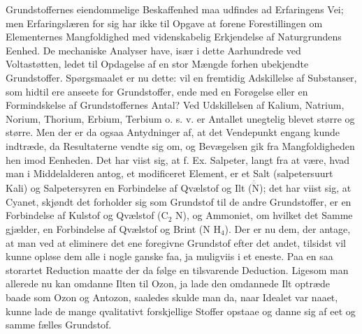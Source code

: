 \documentclass[12pt,a4paper]{book}
\begin{document}
Grundstoffernes eiendommelige Beskaffenhed maa udfindes ad Erfaringens
Vei; men Erfaringslæren for sig har ikke til Opgave at forene
Forestillingen om Elementernes Mangfoldighed med videnskabelig Erkjendelse
af Naturgrundens Eenhed. De mechaniske Analyser have, især i dette
Aarhundrede ved Voltastøtten, ledet til Opdagelse af en stor Mængde
forhen ubekjendte Grundstoffer. Spørgsmaalet er nu dette: vil en fremtidig
Adskillelse af Substanser, som hidtil ere anseete for Grundstoffer, ende
med en Forøgelse eller en Formindskelse af Grundstoffernes Antal? Ved
Udskillelsen af Kalium, Natrium, Norium, Thorium, Erbium, Terbium o. s. v.
er Antallet unegtelig blevet større og større. Men der er da ogsaa
Antydninger af, at det Vendepunkt engang kunde indtræde, da Resultaterne
vendte sig om, og Bevægelsen gik fra Mangfoldigheden hen imod Eenheden.
Det har viist sig, at f. Ex. Salpeter, langt fra at være, hvad man i
Middelalderen antog, et modificeret Element, er et Salt (salpetersuurt
Kali) og Salpetersyren en Forbindelse af Qvælstof og Ilt
($\ddot{\dddot{\mathrm{N}}}$); det har viist sig, at Cyanet, skjøndt det
forholder sig som Grundstof til de andre Grundstoffer, er en Forbindelse
af Kulstof og Qvælstof (C$_2$ N), og Ammoniet, om hvilket det Samme
gjælder, en Forbindelse af Qvælstof og Brint (N H$_4$). Der er nu dem, der
antage, at man ved at eliminere det ene foregivne Grundstof efter det
andet, tilsidst vil kunne opløse dem alle i nogle ganske faa, ja muligviis
i et eneste. Paa en saa storartet Reduction maatte der da følge en
tilsvarende Deduction. Ligesom man allerede nu kan omdanne Ilten til Ozon,
ja lade den omdannede Ilt optræde baade som Ozon og Antozon, saaledes
skulde man da, naar Idealet var naaet, kunne lade de mange qvalitativt
forskjellige Stoffer opstaae og danne sig af eet og samme fælles
Grundstof.
\end{document}
